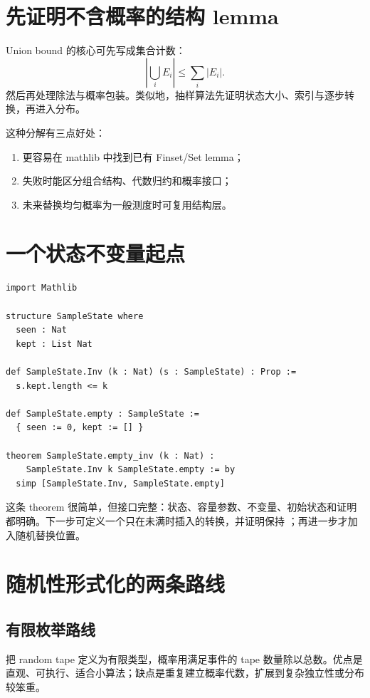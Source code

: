 \section{先证明不含概率的结构 lemma}

Union bound 的核心可先写成集合计数：
\[
\left|\bigcup_i E_i\right|\le\sum_i |E_i|.
\]
然后再处理除法与概率包装。类似地，抽样算法先证明状态大小、索引与逐步转换，再进入分布。

这种分解有三点好处：
\begin{enumerate}
  \item 更容易在 mathlib 中找到已有 Finset/Set lemma；
  \item 失败时能区分组合结构、代数归约和概率接口；
  \item 未来替换均匀概率为一般测度时可复用结构层。
\end{enumerate}

\section{一个状态不变量起点}

\begin{lstlisting}
import Mathlib

structure SampleState where
  seen : Nat
  kept : List Nat

def SampleState.Inv (k : Nat) (s : SampleState) : Prop :=
  s.kept.length <= k

def SampleState.empty : SampleState :=
  { seen := 0, kept := [] }

theorem SampleState.empty_inv (k : Nat) :
    SampleState.Inv k SampleState.empty := by
  simp [SampleState.Inv, SampleState.empty]
\end{lstlisting}
这条 theorem 很简单，但接口完整：状态、容量参数、不变量、初始状态和证明都明确。下一步可定义一个只在未满时插入的转换，并证明保持 ；再进一步才加入随机替换位置。

\section{随机性形式化的两条路线}

\subsection{有限枚举路线}

把 random tape 定义为有限类型，概率用满足事件的 tape 数量除以总数。优点是直观、可执行、适合小算法；缺点是重复建立概率代数，扩展到复杂独立性或分布较笨重。

